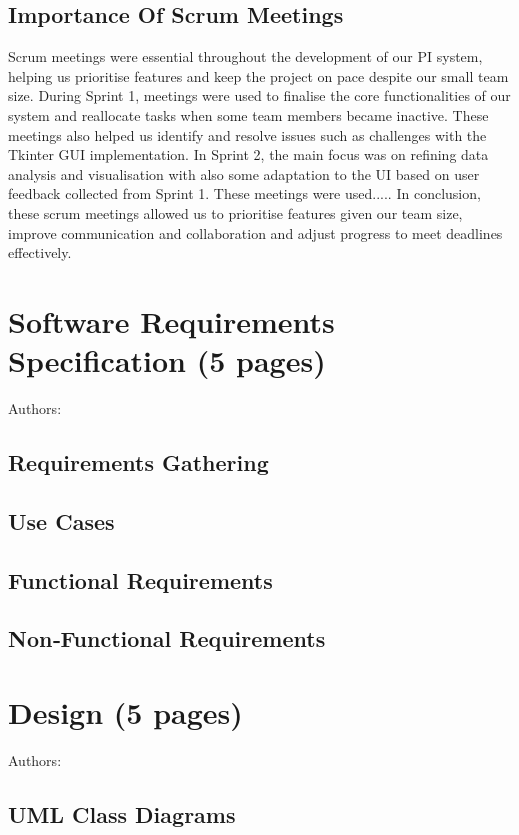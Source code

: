 \documentclass[12pt,a4paper]{article}
\begin{document}
\subsection{Importance Of Scrum Meetings}
Scrum meetings were essential throughout the development of our PI system, helping us prioritise features and keep the project on pace despite our small team size. During Sprint 1, meetings were used to finalise the core functionalities of our system and reallocate tasks when some team members became inactive. These meetings also helped us identify and resolve issues such as challenges with the Tkinter GUI implementation. In Sprint 2, the main focus was on refining data analysis and visualisation with also some adaptation to the UI based on user feedback collected from Sprint 1. These meetings were used..... In conclusion, these scrum meetings allowed us to prioritise features given our team size, improve communication and collaboration and adjust progress to meet deadlines effectively.
\label{sec:agile}


\section{Software Requirements Specification (5 pages)}
Authors:
\label{sec:requirements}
\subsection{Requirements Gathering}

\subsection{Use Cases}

\subsection{Functional Requirements}

\subsection{Non‑Functional Requirements}


\section{Design (5 pages)}
Authors:
\label{sec:design}
\subsection{UML Class Diagrams}
\end{document}
